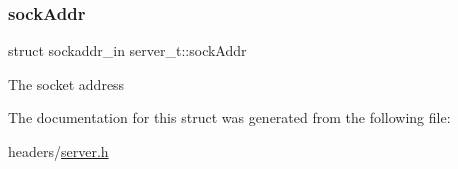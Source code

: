 \subsubsection{\texorpdfstring{sock\+Addr}{sockAddr}}
{\footnotesize\ttfamily struct sockaddr\+\_\+in server\+\_\+t\+::sock\+Addr}

The socket address 

The documentation for this struct was generated from the following file\+:\begin{DoxyCompactItemize}
\item 
headers/\hyperlink{server_8h}{server.\+h}\end{DoxyCompactItemize}
